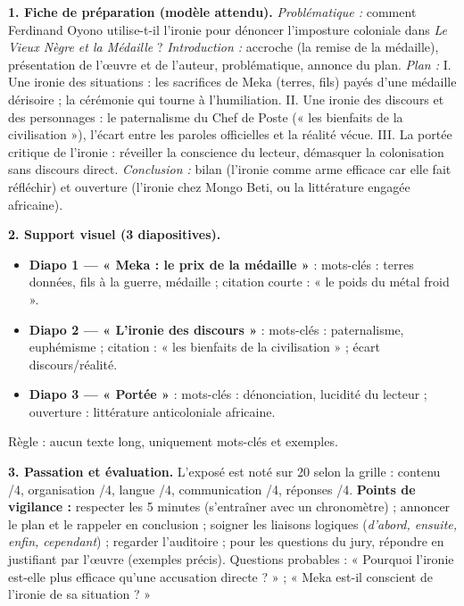 \documentclass[11pt]{article}
\begin{document}
\begin{corrige}
\textbf{1. Fiche de préparation (modèle attendu).}
\emph{Problématique :} comment Ferdinand Oyono utilise-t-il l'ironie pour dénoncer l'imposture coloniale dans \emph{Le Vieux Nègre et la Médaille} ?
\emph{Introduction :} accroche (la remise de la médaille), présentation de l'œuvre et de l'auteur, problématique, annonce du plan.
\emph{Plan :} I. Une ironie des situations : les sacrifices de Meka (terres, fils) payés d'une médaille dérisoire ; la cérémonie qui tourne à l'humiliation. II. Une ironie des discours et des personnages : le paternalisme du Chef de Poste (« les bienfaits de la civilisation »), l'écart entre les paroles officielles et la réalité vécue. III. La portée critique de l'ironie : réveiller la conscience du lecteur, démasquer la colonisation sans discours direct.
\emph{Conclusion :} bilan (l'ironie comme arme efficace car elle fait réfléchir) et ouverture (l'ironie chez Mongo Beti, ou la littérature engagée africaine).

\textbf{2. Support visuel (3 diapositives).}
\begin{itemize}
\item \textbf{Diapo 1 — « Meka : le prix de la médaille »} : mots-clés : terres données, fils à la guerre, médaille ; citation courte : « le poids du métal froid ».
\item \textbf{Diapo 2 — « L'ironie des discours »} : mots-clés : paternalisme, euphémisme ; citation : « les bienfaits de la civilisation » ; écart discours/réalité.
\item \textbf{Diapo 3 — « Portée »} : mots-clés : dénonciation, lucidité du lecteur ; ouverture : littérature anticoloniale africaine.
\end{itemize}
Règle : aucun texte long, uniquement mots-clés et exemples.

\textbf{3. Passation et évaluation.} L'exposé est noté sur 20 selon la grille : contenu /4, organisation /4, langue /4, communication /4, réponses /4. \textbf{Points de vigilance :} respecter les 5 minutes (s'entraîner avec un chronomètre) ; annoncer le plan et le rappeler en conclusion ; soigner les liaisons logiques (\emph{d'abord, ensuite, enfin, cependant}) ; regarder l'auditoire ; pour les questions du jury, répondre en justifiant par l'œuvre (exemples précis). Questions probables : « Pourquoi l'ironie est-elle plus efficace qu'une accusation directe ? » ; « Meka est-il conscient de l'ironie de sa situation ? »
\end{corrige}
\end{document}
